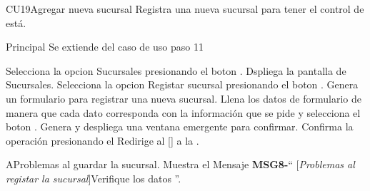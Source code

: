 \begin{UseCase}{CU19}{Agregar nueva sucursal}{
		Registra una nueva sucursal para tener el control de está.
	}
	\end{UseCase}




	\begin{UCtrayectoria}{Principal}
		\UCpaso Se extiende del caso de uso  paso 11

		\UCpaso[\UCactor] Selecciona la opcion Sucursales presionando el boton .
		\UCpaso Dspliega la pantalla de Sucursales.
		\UCpaso[\UCactor] Selecciona la opcion Registar sucursal presionando el boton .
		\UCpaso Genera un formulario para registrar una nueva sucursal. 
		\UCpaso[\UCactor] Llena los datos de formulario de manera que cada dato corresponda con la información que se pide y selecciona el boton  .
		\UCpaso Genera y despliega una ventana emergente para confirmar. 
		\UCpaso [\UCactor] Confirma la operación presionando el 
		\UCpaso Redirige al [\UCactor] a la  .
	\end{UCtrayectoria}




\begin{UCtrayectoriaA}{A}{Problemas al guardar la sucursal.}
			\UCpaso Muestra el Mensaje {\bf MSG8-}`` [{\em Problemas al registar la sucursal}]Verifique los datos ''.
			
		\end{UCtrayectoriaA}

